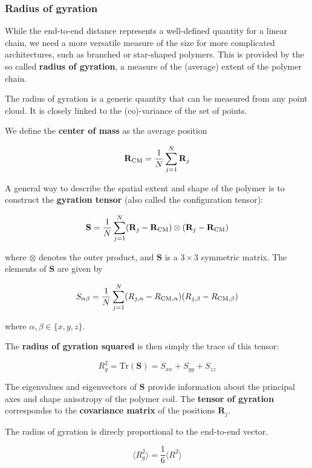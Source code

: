 \documentclass[
  letterpaper,
  enabledeprecatedfontcommands]{report}
\begin{document}
\subsubsection*{Radius of gyration}\label{radius-of-gyration}

While the end-to-end distance represents a well-defined quantity for a
linear chain, we need a more versatile measure of the size for more
complicated architectures, such as branched or star-shaped polymers.
This is provided by the so called \textbf{radius of gyration}, a measure
of the (average) extent of the polymer chain.

The radius of gyration is a generic quantity that can be measured from
any point cloud. It is closely linked to the (co)-variance of the set of
points.

We define the \textbf{center of mass} as the average position

\[\mathbf{R}_{\rm CM}=\frac{1}{N} \sum_{j=1}^{N} \mathbf{R}_{j}\]

A general way to describe the spatial extent and shape of the polymer is
to construct the \textbf{gyration tensor} (also called the configuration
tensor):

\[
\mathbf{S} = \frac{1}{N} \sum_{j=1}^N (\mathbf{R}_j - \mathbf{R}_{\rm CM}) \otimes (\mathbf{R}_j - \mathbf{R}_{\rm CM})
\]

where \(\otimes\) denotes the outer product, and \(\mathbf{S}\) is a
\(3 \times 3\) symmetric matrix. The elements of \(\mathbf{S}\) are
given by

\[
S_{\alpha\beta} = \frac{1}{N} \sum_{j=1}^N (R_{j,\alpha} - R_{{\rm CM},\alpha})(R_{j,\beta} - R_{{\rm CM},\beta})
\]

where \(\alpha, \beta \in \{x, y, z\}\).

The \textbf{radius of gyration squared} is then simply the trace of this
tensor:

\[
R_g^2 = \mathrm{Tr}(\mathbf{S}) = S_{xx} + S_{yy} + S_{zz}
\]

The eigenvalues and eigenvectors of \(\mathbf{S}\) provide information
about the principal axes and shape anisotropy of the polymer coil. The
\textbf{tensor of gyration} correspondss to the \textbf{covariance
matrix} of the positions \(\mathbf{R}_j\).

The radius of gyration is direcly proportional to the end-to-end vector.

\[
\langle R_g^2 \rangle = \frac{1}{6} \langle R^2 \rangle
\]
\end{document}
